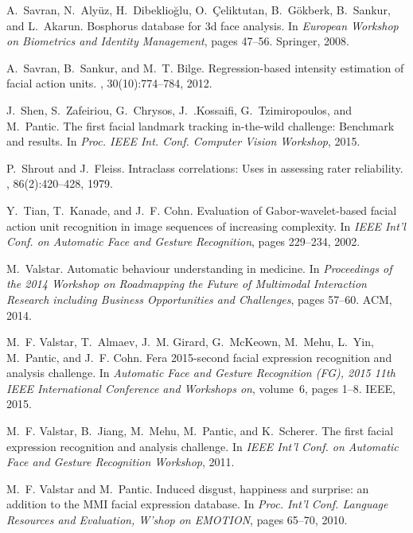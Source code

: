 \documentclass[a4paper, 10pt, conference]{ieeeconf}      \usepackage{FG2017}
\begin{document}
\begin{thebibliography}{10}
A.~Savran, N.~Aly{\"u}z, H.~Dibeklio{\u{g}}lu, O.~{\c{C}}eliktutan,
  B.~G{\"o}kberk, B.~Sankur, and L.~Akarun.
\newblock Bosphorus database for 3d face analysis.
\newblock In {\em European Workshop on Biometrics and Identity Management},
  pages 47--56. Springer, 2008.

A.~Savran, B.~Sankur, and M.~T. Bilge.
\newblock Regression-based intensity estimation of facial action units.
, 30(10):774--784, 2012.

J.~Shen, S.~Zafeiriou, G.~Chrysos, J.~.Kossaifi, G.~Tzimiropoulos, and
  M.~Pantic.
\newblock The first facial landmark tracking in-the-wild challenge: Benchmark
  and results.
\newblock In {\em Proc. IEEE Int. Conf. Computer Vision Workshop}, 2015.

P.~Shrout and J.~Fleiss.
\newblock Intraclass correlations: Uses in assessing rater reliability.
, 86(2):420--428, 1979.

Y.~Tian, T.~Kanade, and J.~F. Cohn.
\newblock Evaluation of {G}abor-wavelet-based facial action unit recognition in
  image sequences of increasing complexity.
\newblock In {\em IEEE Int'l Conf. on Automatic Face and Gesture Recognition},
  pages 229--234, 2002.

M.~Valstar.
\newblock Automatic behaviour understanding in medicine.
\newblock In {\em Proceedings of the 2014 Workshop on Roadmapping the Future of
  Multimodal Interaction Research including Business Opportunities and
  Challenges}, pages 57--60. ACM, 2014.

M.~F. Valstar, T.~Almaev, J.~M. Girard, G.~McKeown, M.~Mehu, L.~Yin, M.~Pantic,
  and J.~F. Cohn.
\newblock Fera 2015-second facial expression recognition and analysis
  challenge.
\newblock In {\em Automatic Face and Gesture Recognition (FG), 2015 11th IEEE
  International Conference and Workshops on}, volume~6, pages 1--8. IEEE, 2015.

M.~F. Valstar, B.~Jiang, M.~Mehu, M.~Pantic, and K.~Scherer.
\newblock The first facial expression recognition and analysis challenge.
\newblock In {\em IEEE Int'l Conf. on Automatic Face and Gesture Recognition
  Workshop}, 2011.

M.~F. Valstar and M.~Pantic.
\newblock Induced disgust, happiness and surprise: an addition to the {MMI}
  facial expression database.
\newblock In {\em Proc. Int'l Conf. Language Resources and Evaluation, W'shop
  on EMOTION}, pages 65--70, 2010.


\end{thebibliography}
\end{document}
